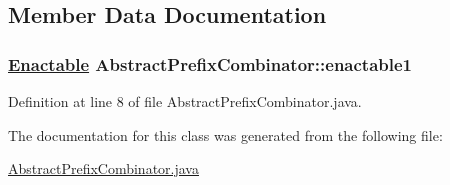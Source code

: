 \subsection{Member Data Documentation}
\hypertarget{classAbstractPrefixCombinator_n0}{
\subsubsection[enactable1]{\setlength{\rightskip}{0pt plus 5cm}\hyperlink{interfaceEnactable}{Enactable} Abstract\-Prefix\-Combinator::enactable1}}
\label{classAbstractPrefixCombinator_n0}




Definition at line 8 of file Abstract\-Prefix\-Combinator.java.

The documentation for this class was generated from the following file:\begin{CompactItemize}
\item 
\hyperlink{AbstractPrefixCombinator_8java-source}{Abstract\-Prefix\-Combinator.java}\end{CompactItemize}
